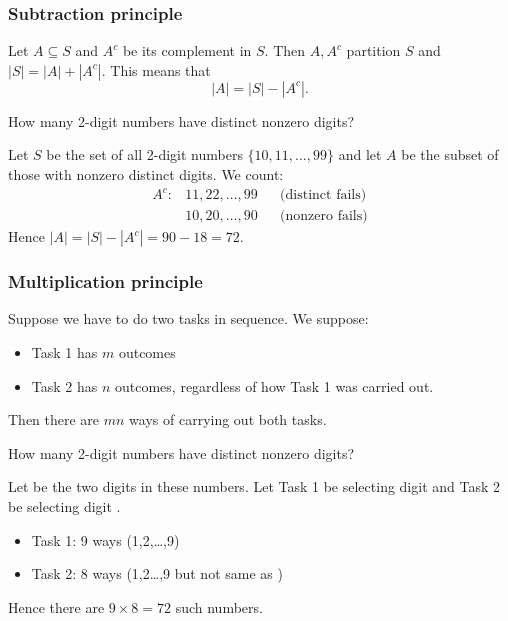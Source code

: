 \documentclass[12pt]{article}
\begin{document}
\subsubsection{Subtraction principle}
 Let $A\subseteq S$ and $A^c$ be its complement in $S$. Then $A, A^c$ partition $S$ and $|S|=|A|+|A^c|$. This means that $$|A|=|S|-|A^c|.$$

\eg How many 2-digit numbers have distinct nonzero digits?

Let $S$ be the set of all 2-digit numbers $\{10,11,\dots,99\}$ and let $A$ be the subset of those with nonzero distinct digits. We count:\begin{align*}
    A^c: &11,22,\dots,99 &&\text{(distinct fails)}\\
    &10,20,\dots, 90 &&\text{(nonzero fails)}
\end{align*}
Hence $|A|=|S|-|A^c|=90-18=72$.

\subsubsection{Multiplication principle}
 Suppose we have to do two tasks in sequence. We suppose:\begin{itemize}
    \item Task 1 has $m$ outcomes
    \item Task 2 has $n$ outcomes, regardless of how Task 1 was carried out.
\end{itemize}
Then there are $mn$ ways of carrying out both tasks.

\eg How many 2-digit numbers have distinct nonzero digits?

Let  be the two digits in these numbers. Let Task 1 be selecting digit  and Task 2 be selecting digit .\begin{itemize}
    \item Task 1: 9 ways (1,2,\dots,9)
    \item Task 2: 8 ways (1,2\dots,9 but not same as )
\end{itemize}
Hence there are $9\times 8=72$ such numbers.
\end{document}
